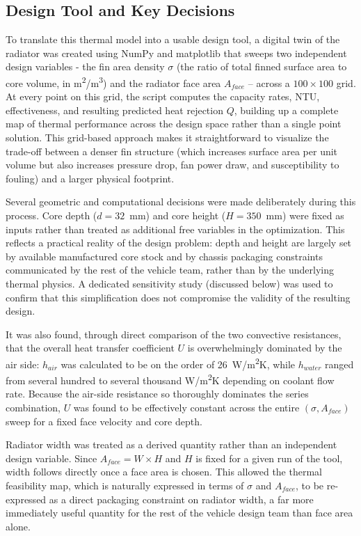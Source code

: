 \documentclass[12pt, a4paper]{article}
\begin{document}
\subsection{Design Tool and Key Decisions}
To translate this thermal model into a usable design tool, a digital twin of the radiator was created using NumPy and matplotlib that sweeps two independent design variables - the fin area density $\sigma$ (the ratio of total finned surface area to core volume, in m\textsuperscript{2}/m\textsuperscript{3}) and the radiator face area $A_{face}$ -- across a $100 \times 100$ grid. At every point on this grid, the script computes the capacity rates, NTU, effectiveness, and resulting predicted heat rejection $Q$, building up a complete map of thermal performance across the design space rather than a single point solution. This grid-based approach makes it straightforward to visualize the trade-off between a denser fin structure (which increases surface area per unit volume but also increases pressure drop, fan power draw, and susceptibility to fouling) and a larger physical footprint.

Several geometric and computational decisions were made deliberately during this process. Core depth ($d = 32$~mm) and core height ($H = 350$~mm) were fixed as inputs rather than treated as additional free variables in the optimization. This reflects a practical reality of the design problem: depth and height are largely set by available manufactured core stock and by chassis packaging constraints communicated by the rest of the vehicle team, rather than by the underlying thermal physics. A dedicated sensitivity study (discussed below) was used to confirm that this simplification does not compromise the validity of the resulting design.

It was also found, through direct comparison of the two convective resistances, that the overall heat transfer coefficient $U$ is overwhelmingly dominated by the air side: $h_{air}$ was calculated to be on the order of 26~W/m\textsuperscript{2}K, while $h_{water}$ ranged from several hundred to several thousand W/m\textsuperscript{2}K depending on coolant flow rate. Because the air-side resistance so thoroughly dominates the series combination, $U$ was found to be effectively constant across the entire $(\sigma, A_{face})$ sweep for a fixed face velocity and core depth. 

Radiator width was treated as a derived quantity rather than an independent design variable. Since $A_{face} = W \times H$ and $H$ is fixed for a given run of the tool, width follows directly once a face area is chosen. This allowed the thermal feasibility map, which is naturally expressed in terms of $\sigma$ and $A_{face}$, to be re-expressed as a direct packaging constraint on radiator width, a far more immediately useful quantity for the rest of the vehicle design team than face area alone.
\end{document}
